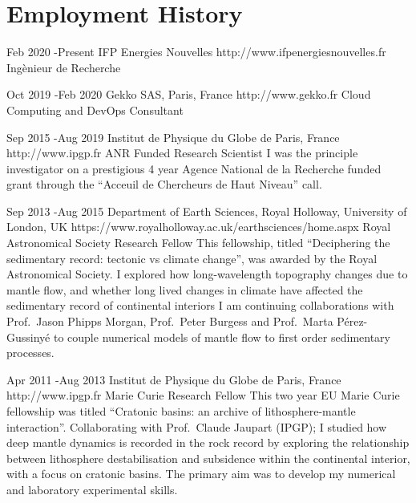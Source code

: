 \section{Employment History}

\job
{Feb 2020 -}{Present}
{IFP Energies Nouvelles}
{http://www.ifpenergiesnouvelles.fr}
{Ingènieur de Recherche}
{}


\job
{Oct 2019 -}{Feb 2020}
{Gekko SAS, Paris, France}
{http://www.gekko.fr}
{Cloud Computing and DevOps Consultant}
{}


\job
{Sep 2015 -}{Aug 2019}
{Institut de Physique du Globe de Paris, France}
{http://www.ipgp.fr}
{ANR Funded Research Scientist}
{I was the principle investigator on a prestigious 4 year Agence National de la Recherche funded grant through the “Acceuil de Chercheurs de Haut Niveau” call.}


\job
{Sep 2013 -}{Aug 2015}
{Department of Earth Sciences, Royal Holloway, University of London, UK}
{https://www.royalholloway.ac.uk/earthsciences/home.aspx}
{Royal Astronomical Society Research Fellow}
{This fellowship, titled “Deciphering the sedimentary record: tectonic vs climate change”, was awarded by the Royal Astronomical Society. I explored how long-wavelength topography changes due to mantle flow, and whether long lived changes in climate have affected the sedimentary record of continental interiors I am continuing collaborations with Prof.~Jason Phipps Morgan, Prof.~Peter Burgess and Prof.~Marta P{\'e}rez-Gussiny{\'e} to couple numerical models of mantle flow to first order sedimentary processes.}


\job
{Apr 2011 -}{Aug 2013}
{Institut de Physique du Globe de Paris, France}
{http://www.ipgp.fr}
{Marie Curie Research Fellow}
{This two year EU Marie Curie fellowship was titled “Cratonic basins: an archive of lithosphere-mantle interaction”. Collaborating with Prof.~Claude Jaupart (IPGP); I studied how deep mantle dynamics is recorded in the rock record by exploring the relationship between lithosphere destabilisation and subsidence within the continental interior, with a focus on cratonic basins. The primary aim was to develop my numerical and laboratory experimental skills.}

